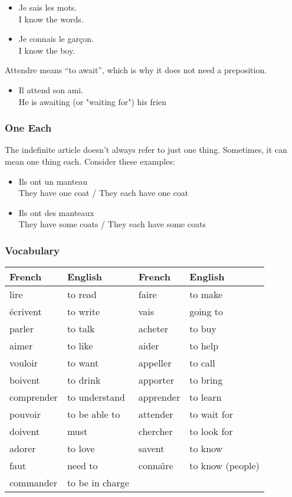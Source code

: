 \begin{itemize}
  \item  Je sais les mots. \\ I know the words.
  \item  Je connais le garçon. \\ I know the boy.
\end{itemize}

Attendre means ``to await'', which is why it does not need a preposition.

\begin{itemize}
  \item  Il attend son ami. \\ He is awaiting (or "waiting for") his frien
\end{itemize}

\subsubsection{One Each}

The indefinite article doesn't always refer to just one thing. Sometimes, it can mean one thing each. Consider these examples:

\begin{itemize}
  \item  Ils ont un manteau \\ They have one coat / They each have one coat
  \item  Ils ont des manteaux \\ They have some coats / They each have some coats
\end{itemize}

\subsubsection{Vocabulary}

\begin{center}\begin{tabular}{l|l||l|l}
\textbf{French} & \textbf{English} & \textbf{French} & \textbf{English} \\ \hline
lire & to read & faire & to make \\ 
{\'e}crivent & to write & vais & going to \\ 
parler & to talk & acheter & to buy \\ 
aimer & to like & aider & to help \\ 
vouloir & to want & appeller & to call \\ 
boivent & to drink & apporter & to bring \\
comprender & to understand & apprender & to learn \\ 
pouvoir & to be able to & attender & to wait for \\ 
doivent & must & chercher & to look for \\ 
adorer & to love &  savent & to know \\
faut & need to & conna\^{\i}re & to know (people) \\
commander & to be in charge \\
\end{tabular}\end{center}


